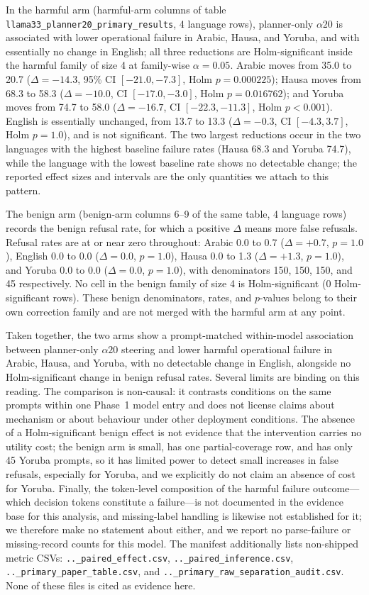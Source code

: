 In the harmful arm (harmful-arm columns of table
\texttt{llama33\_planner20\_primary\_results}, 4 language rows), planner-only
$\alpha20$ is associated with lower operational failure in Arabic, Hausa, and
Yoruba, and with essentially no change in English; all three reductions are
Holm-significant inside the harmful family of size 4 at family-wise
$\alpha = 0.05$. Arabic moves from 35.0 to 20.7 ($\Delta = -14.3$, 95\% CI
$[-21.0, -7.3]$, Holm $p = 0.000225$); Hausa moves from 68.3 to 58.3
($\Delta = -10.0$, CI $[-17.0, -3.0]$, Holm $p = 0.016762$); and Yoruba moves
from 74.7 to 58.0 ($\Delta = -16.7$, CI $[-22.3, -11.3]$, Holm $p < 0.001$).
English is essentially unchanged, from 13.7 to 13.3 ($\Delta = -0.3$, CI
$[-4.3, 3.7]$, Holm $p = 1.0$), and is not significant. The two largest
reductions occur in the two languages with the highest baseline failure rates
(Hausa 68.3 and Yoruba 74.7), while the language with the lowest baseline rate
shows no detectable change; the reported effect sizes and intervals are the only
quantities we attach to this pattern.

The benign arm (benign-arm columns 6--9 of the same table, 4 language rows)
records the benign refusal rate, for which a positive $\Delta$ means more false
refusals. Refusal rates are at or near zero throughout: Arabic 0.0 to 0.7
($\Delta = +0.7$, $p = 1.0$), English 0.0 to 0.0 ($\Delta = 0.0$, $p = 1.0$),
Hausa 0.0 to 1.3 ($\Delta = +1.3$, $p = 1.0$), and Yoruba 0.0 to 0.0
($\Delta = 0.0$, $p = 1.0$), with denominators 150, 150, 150, and 45
respectively. No cell in the benign family of size 4 is Holm-significant
(0 Holm-significant rows). These benign denominators, rates, and $p$-values
belong to their own correction family and are not merged with the harmful arm at
any point.

Taken together, the two arms show a prompt-matched within-model association
between planner-only $\alpha20$ steering and lower harmful operational failure
in Arabic, Hausa, and Yoruba, with no detectable change in English, alongside no
Holm-significant change in benign refusal rates. Several limits are binding on
this reading. The comparison is non-causal: it contrasts conditions on the same
prompts within one Phase~1 model entry and does not license claims about
mechanism or about behaviour under other deployment conditions. The absence of a
Holm-significant benign effect is not evidence that the intervention carries no
utility cost; the benign arm is small, has one partial-coverage row, and has only
45 Yoruba prompts, so it has limited power to detect small increases in false
refusals, especially for Yoruba, and we explicitly do not claim an absence of
cost for Yoruba. Finally, the token-level composition of the harmful failure
outcome---which decision tokens constitute a failure---is not documented in the
evidence base for this analysis, and missing-label handling is likewise not
established for it; we therefore make no statement about either, and we report no
parse-failure or missing-record counts for this model. The manifest additionally
lists non-shipped metric CSVs: \texttt{..\_paired\_effect.csv},
\texttt{..\_paired\_inference.csv}, \texttt{..\_primary\_paper\_table.csv}, and
\texttt{..\_primary\_raw\_separation\_audit.csv}. None of these files is cited as
evidence here.

